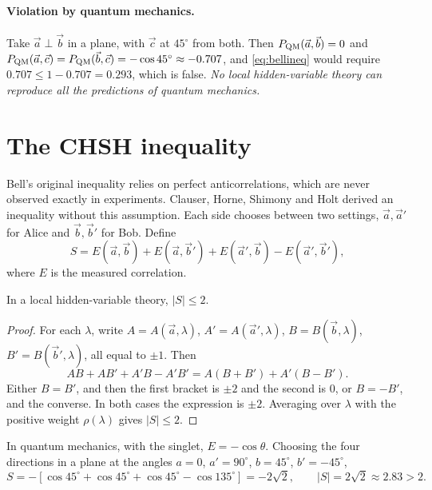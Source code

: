 \paragraph{Violation by quantum mechanics.} Take $\vec a\perp\vec b$ in a plane, with $\vec c$ at $45^\circ$ from both. Then
$P_{\rm QM}(\vec a,\vec b)=0$ and $P_{\rm QM}(\vec a,\vec c)=P_{\rm QM}(\vec b,\vec c)=-\cos45^\circ\approx-0.707$, and \cref{eq:bellineq} would require
$0.707\le1-0.707=0.293$, which is false. \emph{No local hidden-variable theory can reproduce all the predictions of quantum mechanics.}

\section{The CHSH inequality}
Bell's original inequality relies on perfect anticorrelations, which are never observed exactly in experiments. Clauser, Horne, Shimony and Holt \cite{CHSH1969}
derived an inequality without this assumption. Each side chooses between two settings, $\vec a,\vec a'$ for Alice and $\vec b,\vec b'$ for Bob. Define
\begin{equation}
  S=E(\vec a,\vec b)+E(\vec a,\vec b')+E(\vec a',\vec b)-E(\vec a',\vec b'),
\end{equation}
where $E$ is the measured correlation.
\begin{theorem}[CHSH]
In a local hidden-variable theory, $|S|\le2$.
\end{theorem}
\begin{proof}
For each $\lambda$, write $A=A(\vec a,\lambda)$, $A'=A(\vec a',\lambda)$, $B=B(\vec b,\lambda)$, $B'=B(\vec b',\lambda)$, all equal to $\pm1$. Then
\begin{equation}
  AB+AB'+A'B-A'B'=A(B+B')+A'(B-B').
\end{equation}
Either $B=B'$, and then the first bracket is $\pm2$ and the second is $0$, or $B=-B'$, and the converse. In both cases the expression is $\pm2$.
Averaging over $\lambda$ with the positive weight $\rho(\lambda)$ gives $|S|\le2$.
\end{proof}
In quantum mechanics, with the singlet, $E=-\cos\theta$. Choosing the four directions in a plane at the angles $a=0$, $a'=90^\circ$, $b=45^\circ$, $b'=-45^\circ$,
\begin{equation}
  S=-\left[\cos45^\circ+\cos45^\circ+\cos45^\circ-\cos135^\circ\right]=-2\sqrt2,\qquad|S|=2\sqrt2\approx2.83>2.
\end{equation}

